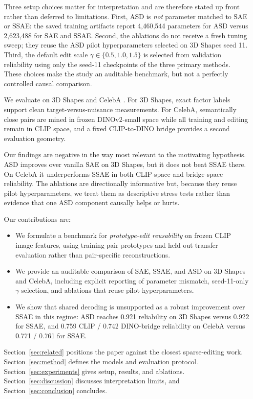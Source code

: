 \documentclass{article}
\begin{document}
Three setup choices matter for interpretation and are therefore stated up front rather than deferred to limitations. First, ASD is \emph{not} parameter matched to SAE or SSAE: the saved training artifacts report 4,460,544 parameters for ASD versus 2,623,488 for SAE and SSAE. Second, the ablations do not receive a fresh tuning sweep; they reuse the ASD pilot hyperparameters selected on 3D Shapes seed 11. Third, the default edit scale $\gamma \in \{0.5, 1.0, 1.5\}$ is selected from validation reliability using only the seed-11 checkpoints of the three primary methods. These choices make the study an auditable benchmark, but not a perfectly controlled causal comparison.

We evaluate on 3D Shapes and CelebA \citep{liu2015deep}. For 3D Shapes, exact factor labels support clean target-versus-nuisance measurements. For CelebA, semantically close pairs are mined in frozen DINOv2-small space \citep{oquab2024dinov2} while all training and editing remain in CLIP space, and a fixed CLIP-to-DINO bridge provides a second evaluation geometry.

Our findings are negative in the way most relevant to the motivating hypothesis. ASD improves over vanilla SAE on 3D Shapes, but it does not beat SSAE there. On CelebA it underperforms SSAE in both CLIP-space and bridge-space reliability. The ablations are directionally informative but, because they reuse pilot hyperparameters, we treat them as descriptive stress tests rather than evidence that one ASD component causally helps or hurts.

Our contributions are:
\begin{itemize}
  \item We formulate a benchmark for \emph{prototype-edit reusability} on frozen CLIP image features, using training-pair prototypes and held-out transfer evaluation rather than pair-specific reconstructions.
  \item We provide an auditable comparison of SAE, SSAE, and ASD on 3D Shapes and CelebA, including explicit reporting of parameter mismatch, seed-11-only $\gamma$ selection, and ablations that reuse pilot hyperparameters.
  \item We show that shared decoding is unsupported as a robust improvement over SSAE in this regime: ASD reaches 0.921 reliability on 3D Shapes versus 0.922 for SSAE, and 0.759 CLIP / 0.742 DINO-bridge reliability on CelebA versus 0.771 / 0.761 for SSAE.
\end{itemize}

Section~\ref{sec:related} positions the paper against the closest sparse-editing work. Section~\ref{sec:method} defines the models and evaluation protocol. Section~\ref{sec:experiments} gives setup, results, and ablations. Section~\ref{sec:discussion} discusses interpretation limits, and Section~\ref{sec:conclusion} concludes.
\end{document}
